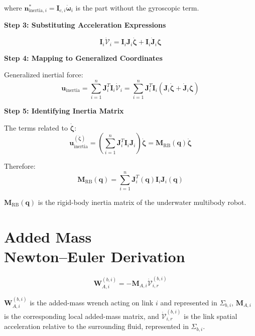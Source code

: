 \documentclass[12pt,a4paper]{report}
\newcommand{\newsymbols}[1]{\par\noindent{}#1\par\vspace{0.35em}}
\newcommand{\Frame}[1]{\Sigma_{#1}}
\begin{document}
where $\mathbf{n}_{\text{inertia},i}^* = \mathbf{I}_{c,i}\dot{\boldsymbol{\omega}}_i$ is the part without the gyroscopic term.

\textbf{Step 3: Substituting Acceleration Expressions}

\begin{equation}
\mathbf{I}_i \dot{\mathcal{V}}_i = \mathbf{I}_i \mathbf{J}_i \dot{\boldsymbol{\zeta}} + \mathbf{I}_i \dot{\mathbf{J}}_i \boldsymbol{\zeta}
\end{equation}

\textbf{Step 4: Mapping to Generalized Coordinates}

Generalized inertial force:
\begin{equation}
\mathbf{u}_{\text{inertia}} = \sum_{i=1}^{n} \mathbf{J}_i^T \mathbf{I}_i \dot{\mathcal{V}}_i = \sum_{i=1}^{n} \mathbf{J}_i^T \mathbf{I}_i (\mathbf{J}_i \dot{\boldsymbol{\zeta}} + \dot{\mathbf{J}}_i \boldsymbol{\zeta})
\label{eq:old-107}
\end{equation}

\textbf{Step 5: Identifying Inertia Matrix}

The terms related to $\dot{\boldsymbol{\zeta}}$:
\begin{equation}
\mathbf{u}_{\text{inertia}}^{(\dot{\boldsymbol{\zeta}})} = \left(\sum_{i=1}^{n} \mathbf{J}_i^T \mathbf{I}_i \mathbf{J}_i\right) \dot{\boldsymbol{\zeta}} = \mathbf{M}_{\text{RB}}(\mathbf{q}) \dot{\boldsymbol{\zeta}}
\end{equation}

Therefore:
\begin{equation}
\boxed{\mathbf{M}_{\text{RB}}(\mathbf{q}) = \sum_{i=1}^{n} \mathbf{J}_i^T(\mathbf{q}) \mathbf{I}_i \mathbf{J}_i(\mathbf{q})}
\label{eq:old-108}
\end{equation}
\newsymbols{$\mathbf{M}_{\text{RB}}(\mathbf{q})$ is the rigid-body inertia matrix of the underwater multibody robot.}

\section[Added-Mass Derivation]{Added Mass\\ Newton--Euler Derivation}

\begin{equation}
\mathbf{W}_{A,i}^{(b,i)} = -\mathbf{M}_{A,i}\dot{\mathcal{V}}_{i,r}^{(b,i)}
\label{eq:old-109}
\end{equation}
\newsymbols{$\mathbf{W}_{A,i}^{(b,i)}$ is the added-mass wrench acting on link $i$ and represented in $\Frame{b,i}$, $\mathbf{M}_{A,i}$ is the corresponding local added-mass matrix, and $\dot{\mathcal{V}}_{i,r}^{(b,i)}$ is the link spatial acceleration relative to the surrounding fluid, represented in $\Frame{b,i}$.}
\end{document}
